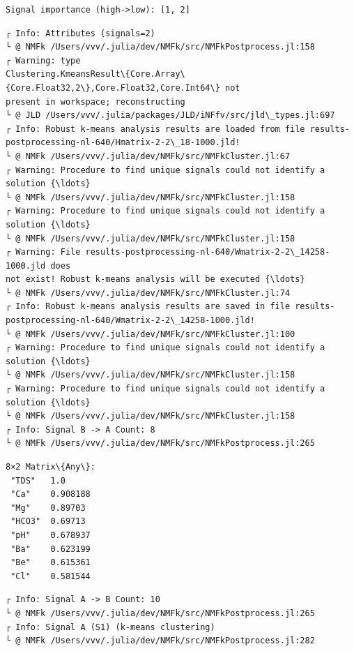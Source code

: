 \documentclass[11pt]{article}
\begin{document}
    \begin{Verbatim}[commandchars=\\\{\}]
Signal importance (high->low): [1, 2]
    \end{Verbatim}

    \begin{Verbatim}[commandchars=\\\{\}]
┌ Info: Attributes (signals=2)
└ @ NMFk /Users/vvv/.julia/dev/NMFk/src/NMFkPostprocess.jl:158
┌ Warning: type
Clustering.KmeansResult\{Core.Array\{Core.Float32,2\},Core.Float32,Core.Int64\} not
present in workspace; reconstructing
└ @ JLD /Users/vvv/.julia/packages/JLD/iNFfv/src/jld\_types.jl:697
┌ Info: Robust k-means analysis results are loaded from file results-
postprocessing-nl-640/Hmatrix-2-2\_18-1000.jld!
└ @ NMFk /Users/vvv/.julia/dev/NMFk/src/NMFkCluster.jl:67
┌ Warning: Procedure to find unique signals could not identify a solution {\ldots}
└ @ NMFk /Users/vvv/.julia/dev/NMFk/src/NMFkCluster.jl:158
┌ Warning: Procedure to find unique signals could not identify a solution {\ldots}
└ @ NMFk /Users/vvv/.julia/dev/NMFk/src/NMFkCluster.jl:158
┌ Warning: File results-postprocessing-nl-640/Wmatrix-2-2\_14258-1000.jld does
not exist! Robust k-means analysis will be executed {\ldots}
└ @ NMFk /Users/vvv/.julia/dev/NMFk/src/NMFkCluster.jl:74
┌ Info: Robust k-means analysis results are saved in file results-
postprocessing-nl-640/Wmatrix-2-2\_14258-1000.jld!
└ @ NMFk /Users/vvv/.julia/dev/NMFk/src/NMFkCluster.jl:100
┌ Warning: Procedure to find unique signals could not identify a solution {\ldots}
└ @ NMFk /Users/vvv/.julia/dev/NMFk/src/NMFkCluster.jl:158
┌ Warning: Procedure to find unique signals could not identify a solution {\ldots}
└ @ NMFk /Users/vvv/.julia/dev/NMFk/src/NMFkCluster.jl:158
┌ Info: Signal B -> A Count: 8
└ @ NMFk /Users/vvv/.julia/dev/NMFk/src/NMFkPostprocess.jl:265
    \end{Verbatim}


    \begin{Verbatim}[commandchars=\\\{\}]
8×2 Matrix\{Any\}:
 "TDS"   1.0
 "Ca"    0.908188
 "Mg"    0.89703
 "HCO3"  0.69713
 "pH"    0.678937
 "Ba"    0.623199
 "Be"    0.615361
 "Cl"    0.581544
    \end{Verbatim}


    \begin{Verbatim}[commandchars=\\\{\}]
┌ Info: Signal A -> B Count: 10
└ @ NMFk /Users/vvv/.julia/dev/NMFk/src/NMFkPostprocess.jl:265
┌ Info: Signal A (S1) (k-means clustering)
└ @ NMFk /Users/vvv/.julia/dev/NMFk/src/NMFkPostprocess.jl:282
    \end{Verbatim}
\end{document}
